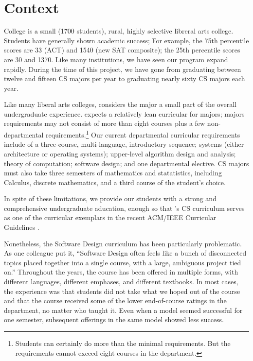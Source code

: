 \section{Context}

\college College is a small (1700 students), rural, highly selective
libreral arts college.  Students have generally shown academic
success; For example, the 75th percentile scores are 33 (ACT) and
1540 (new SAT composite); the 25th percentile scores are 30 and
1370.  Like many institutions, we have seen our program expand
rapidly.  During the time of this project, we have gone from
graduating between twelve and fifteen CS majors per year to graduating
nearly sixty CS majors each year.

Like many liberal arts colleges, \college considers the major a
small part of the overall undergraduate experience.  \college expects
a relatively lean curricular for majors; majors requirements may
not consist of more than eight courses plus a few non-departmental
requirements.\footnote{Students can certainly do more than the
minimal requirements.  But the requirements cannot exceed eight
courses in the department.} Our current departmental curricular
requirements include of a three-course, multi-language, introductory
sequence; systems (either architecture or operating systems);
upper-level algorithm design and analysis; theory of computation;
software design; and one departmental elective.  CS majors must
also take three semesters of mathematics and statatistics, including
Calculus, discrete mathematics, and a third course of the student's
choice.  

In spite of these limitations, we provide our students with a strong
and comprehensive undergraduate aducation, enough so that \college's
CS curriculum serves as one of the curricular exemplars in the
recent ACM/IEEE Curricular Guidelines \cite{curriclum-2013}.

Nonetheless, the Software Design curriculum has been particularly
problematic.  As one colleague put it, ``Software Design often feels
like a bunch of disconnected topics placed together into a single
course, with a large, ambiguous project tied on.''  Throughout the
years, the course has been offered in multiple forms, with different
languages, different emphases, and different textbooks.  In most
cases, the experience was that students did not take what we hoped
out of the course and that the course received some of the lower
end-of-course ratings in the department, no matter who taught it.
Even when a model seemed successful for one semester, subsequent
offerings in the same model showed less success.

